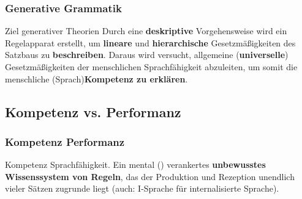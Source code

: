 \begin{frame}
\frametitle{Generative Grammatik}

\begin{block}{Ziel generativer Theorien}
Durch eine \textbf{deskriptive} Vorgehensweise wird ein Regelapparat erstellt, um \textbf{lineare} und \textbf{hierarchische} Gesetzmäßigkeiten des Satzbaus zu \textbf{beschreiben}. Daraus wird versucht, allgemeine (\textbf{universelle}) Gesetzmäßigkeiten der menschlichen Sprachfähigkeit abzuleiten, um somit die menschliche (Sprach)\textbf{Kompetenz zu erklären}.
\end{block}

\end{frame}


\subsection{Kompetenz vs. Performanz}


\begin{frame}
\frametitle{Kompetenz \vs Performanz}

\begin{block}{Kompetenz}
Sprachfähigkeit. Ein mental () verankertes \textbf{unbewusstes Wissenssystem von Regeln}, das der Produktion und Rezeption unendlich vieler Sätzen zugrunde liegt (auch: I-Sprache für internalisierte Sprache).
\end{block}	


\end{frame}


